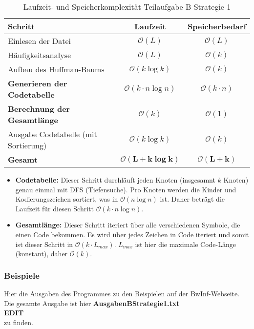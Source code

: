 \documentclass[a4paper,10pt,ngerman]{scrartcl}
\begin{document}
\begin{table}[H]
\centering
\begin{tabular}{|l|c|c|}
\hline
\textbf{Schritt} & \textbf{Laufzeit} & \textbf{Speicherbedarf} \\
\hline
Einlesen der Datei & $\mathcal{O}(L)$ & $\mathcal{O}(L)$ \\
Häufigkeitsanalyse & $\mathcal{O}(L)$ & $\mathcal{O}(k)$ \\
Aufbau des Huffman-Baums & $\mathcal{O}(k \log k)$ & $\mathcal{O}(k)$ \\
\textbf{Generieren der Codetabelle} & $\mathcal{O}(k \cdot n \log n)$ & $\mathcal{O}(k \cdot n)$ \\
\textbf{Berechnung der Gesamtlänge} & $\mathcal{O}(k)$ & $\mathcal{O}(1)$ \\
Ausgabe Codetabelle (mit Sortierung) & $\mathcal{O}(k \log k)$ & $\mathcal{O}(k)$ \\
\hline
\textbf{Gesamt} & $\boldsymbol{\mathcal{O}(L + k \log k)}$ & $\boldsymbol{\mathcal{O}(L + k)}$ \\
\hline
\end{tabular}
\caption{Laufzeit- und Speicherkomplexität Teilaufgabe B Strategie 1}
\end{table}

\vspace{1em}

\begin{itemize}
  \item \textbf{Codetabelle:} Dieser Schritt durchläuft jeden Knoten (insgesamnt $k$ Knoten) genau einmal mit DFS (Tiefensuche). Pro Knoten werden die Kinder und Kodierungszeichen sortiert, was in $\mathcal{O}(n \log n)$ ist. Daher beträgt die Laufzeit für diesen Schritt $\mathcal{O}(k \cdot n \log n)$.

  \item \textbf{Gesamtlänge:} Dieser Schritt iteriert über alle verschiedenen Symbole, die einen Code bekommen. Es wird über jedes Zeichen in Code iteriert und somit ist dieser Schritt in $\mathcal{O}(k \cdot L_{max})$. $L_{max}$ ist hier die maximale Code-Länge (konstant), daher $\mathcal{O}(k)$.
\end{itemize}
\subsubsection{Beispiele}
Hier die Ausgaben des Programmes zu den Beispielen auf der BwInf-Webseite. \\Die gesamte Ausgabe ist hier \textbf{AusgabenBStrategie1.txt} \\ \newline \textbf{EDIT} \\ \newline zu finden. 
\end{document}
